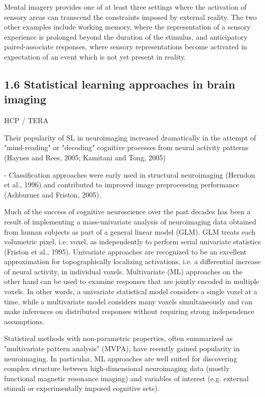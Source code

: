 \documentclass[authoryear,review,3p]{elsarticle}
\begin{document}
Mental imagery provides one of at least three settings where the activation of sensory areas can transcend the constraints imposed by external reality. The two other examples include working memory, where the representation of a sensory experience is prolonged beyond the duration of the stimulus, and anticipatory paired-associate responses, where sensory representations become activated in expectation of an event which is not yet present in reality.




\subsection*{1.6 Statistical learning approaches in brain imaging}

HCP / TERA

Their popularity of SL in neuroimaging increased dramatically in the attempt of "mind-reading" or "decoding" cognitive processes from neural activity patterns (Haynes and Rees, 2005; Kamitani and Tong, 2005)

- Classification approaches were early used in structural neuroimaging (Herndon et al., 1996) and contributed to improved image preprocessing performance (Ashburner and Friston, 2005).



Much of the success of cognitive neuroscience over the past decades has been a result of implementing a mass-univariate analysis of neuroimaging data obtained from human subjects as part of a general linear model (GLM). GLM treats each volumetric pixel, i.e. voxel, as independently to perform serial univariate statistics (Friston et al., 1995). 
Univariate approaches are recognized to be an excellent approximation for topographically localizing activations, i.e. a differential increase of neural activity, in individual voxels. Multivariate (ML) approaches on the other hand can be used to examine responses that are jointly encoded in multiple voxels. In other words, a univariate statistical model considers a single voxel at a time, while a multivariate model considers many voxels simultaneously and can make inferences on distributed responses without requiring strong independence assumptions. 

Statistical methods with non-parametric properties, often summarized as "multivariate pattern analysis" (MVPA), have recently gained popularity in neuroimaging. In particular, ML approaches are well suited for discovering complex structure between high-dimensional neuroimaging data (mostly functional magnetic resonance imaging) and variables of interest (e.g. external stimuli or experimentally imposed cognitive sets). 
\end{document}
